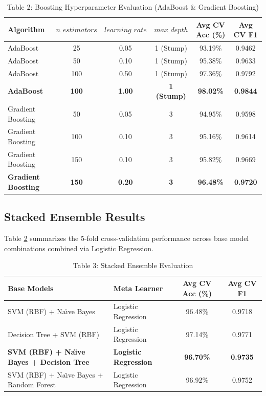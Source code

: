 \documentclass[12pt,a4paper]{article}
\begin{document}
\begin{table}[H]
\centering
\caption{Table 2: Boosting Hyperparameter Evaluation (AdaBoost \& Gradient Boosting)}
\label{tab:boosting}
\begin{tabular}{|l|c|c|c|c|c|}
\hline
\textbf{Algorithm} & \textbf{$n\_estimators$} & \textbf{$learning\_rate$} & \textbf{$max\_depth$} & \textbf{Avg CV Acc (\%)} & \textbf{Avg CV F1} \\ \hline
AdaBoost & 25 & 0.05 & 1 (Stump) & 93.19\% & 0.9462 \\ \hline
AdaBoost & 50 & 0.10 & 1 (Stump) & 95.38\% & 0.9633 \\ \hline
AdaBoost & 100 & 0.50 & 1 (Stump) & 97.36\% & 0.9792 \\ \hline
\textbf{AdaBoost} & \textbf{100} & \textbf{1.00} & \textbf{1 (Stump)} & \textbf{98.02\%} & \textbf{0.9844} \\ \hline
Gradient Boosting & 50 & 0.05 & 3 & 94.95\% & 0.9598 \\ \hline
Gradient Boosting & 100 & 0.10 & 3 & 95.16\% & 0.9614 \\ \hline
Gradient Boosting & 150 & 0.10 & 3 & 95.82\% & 0.9669 \\ \hline
\textbf{Gradient Boosting} & \textbf{150} & \textbf{0.20} & \textbf{3} & \textbf{96.48\%} & \textbf{0.9720} \\ \hline
\end{tabular}
\end{table}

\subsection{Stacked Ensemble Results}
Table \ref{tab:stacking} summarizes the 5-fold cross-validation performance across base model combinations combined via Logistic Regression.

\begin{table}[H]
\centering
\caption{Table 3: Stacked Ensemble Evaluation}
\label{tab:stacking}
\begin{tabular}{|p{7.5cm}|p{3.5cm}|c|c|}
\hline
\textbf{Base Models} & \textbf{Meta Learner} & \textbf{Avg CV Acc (\%)} & \textbf{Avg CV F1} \\ \hline
SVM (RBF) + Na\"\i ve Bayes & Logistic Regression & 96.48\% & 0.9718 \\ \hline
Decision Tree + SVM (RBF) & Logistic Regression & 97.14\% & 0.9771 \\ \hline
\textbf{SVM (RBF) + Na\"\i ve Bayes + Decision Tree} & \textbf{Logistic Regression} & \textbf{96.70\%} & \textbf{0.9735} \\ \hline
SVM (RBF) + Na\"\i ve Bayes + Random Forest & Logistic Regression & 96.92\% & 0.9752 \\ \hline
\end{tabular}
\end{table}
\end{document}
